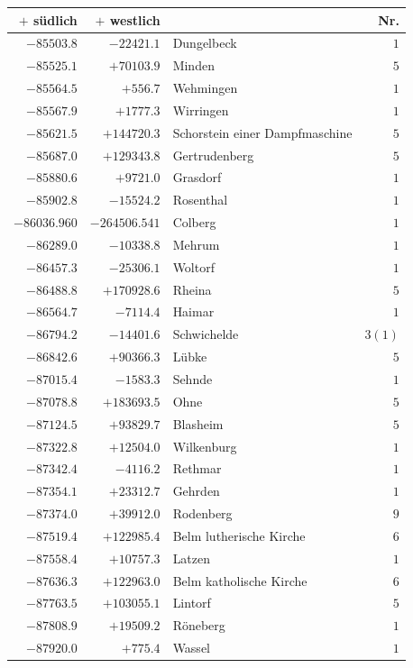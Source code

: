 \begin{center}\begingroup\fontsize{8}{9}\selectfont
\setlength{\tabcolsep}{4pt}
\begin{tabular}{r|r|p{170pt}|r}\hline
\(+\) südlich&\(+\) westlich&&Nr.\\\hline
\(-85503.8\)&\(-22421.1\)&Dungelbeck&\(1\)\\
\(-85525.1\)&\(+70103.9\)&Minden&\(5\)\\
\(-85564.5\)&\(+556.7\)&Wehmingen&\(1\)\\
\(-85567.9\)&\(+1777.3\)&Wirringen&\(1\)\\
\(-85621.5\)&\(+144720.3\)&Schorstein einer Dampfmaschine&\(5\)\\
\(-85687.0\)&\(+129343.8\)&Gertrudenberg&\(5\)\\
\(-85880.6\)&\(+9721.0\)&Grasdorf&\(1\)\\
\(-85902.8\)&\(-15524.2\)&Rosenthal&\(1\)\\
\(-86036.960\)&\(-264506.541\)&Colberg&\(1\)\\
\(-86289.0\)&\(-10338.8\)&Mehrum&\(1\)\\
\(-86457.3\)&\(-25306.1\)&Woltorf&\(1\)\\
\(-86488.8\)&\(+170928.6\)&Rheina&\(5\)\\
\(-86564.7\)&\(-7114.4\)&Haimar&\(1\)\\
\(-86794.2\)&\(-14401.6\)&Schwichelde&\(3 (1)\)\\
\(-86842.6\)&\(+90366.3\)&Lübke&\(5\)\\
\(-87015.4\)&\(-1583.3\)&Sehnde&\(1\)\\
\(-87078.8\)&\(+183693.5\)&Ohne&\(5\)\\
\(-87124.5\)&\(+93829.7\)&Blasheim&\(5\)\\
\(-87322.8\)&\(+12504.0\)&Wilkenburg&\(1\)\\
\(-87342.4\)&\(-4116.2\)&Rethmar&\(1\)\\
\(-87354.1\)&\(+23312.7\)&Gehrden&\(1\)\\
\(-87374.0\)&\(+39912.0\)&Rodenberg&\(9\)\\
\(-87519.4\)&\(+122985.4\)&Belm lutherische Kirche&\(6\)\\
\(-87558.4\)&\(+10757.3\)&Latzen&\(1\)\\
\(-87636.3\)&\(+122963.0\)&Belm katholische Kirche&\(6\)\\
\(-87763.5\)&\(+103055.1\)&Lintorf&\(5\)\\
\(-87808.9\)&\(+19509.2\)&Röneberg&\(1\)\\
\(-87920.0\)&\(+775.4\)&Wassel&\(1\)\\

\end{tabular}
\end{center}
